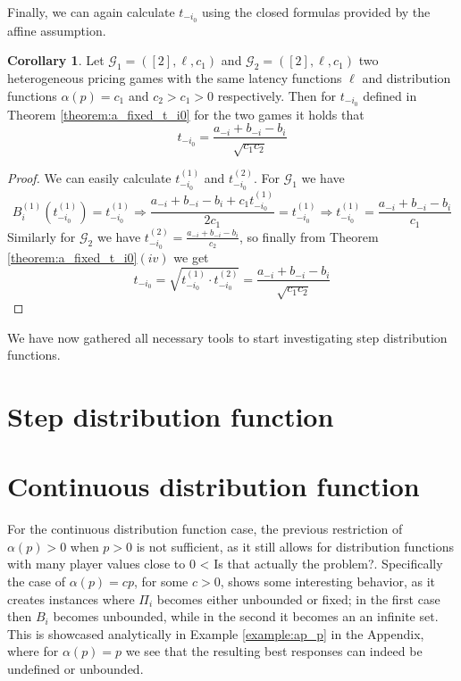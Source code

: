 \documentclass[10pt,a4paper]{book}
\newcommand{\Gm}{\mathcal{G}}
\theoremstyle{definition}
\newtheorem{corollary}[definition]{Corollary}
\theoremstyle{comment}
\begin{document}
Finally, we can again calculate $t_{-i_0}$ using the closed formulas provided by the affine assumption.

\begin{corollary}
	\label{corollary:a_fixed_ti0_calc}
	Let $\Gm_1 = ([2], \ell, c_1)$ and $\Gm_2 = ([2], \ell, c_1)$ two heterogeneous pricing games with the same latency functions $\ell$ and distribution functions $\alpha(p) = c_1$ and $c_2 > c_1 > 0$ respectively.
	Then for $t_{-i_0}$ defined in Theorem \ref{theorem:a_fixed_t_i0} for the two games it holds that
	\[t_{-i_0} = \frac{a_{-i} + b_{-i} - b_i}{\sqrt{c_1 c_2}}\]
\end{corollary}

\begin{proof}
	We can easily calculate $t_{-i_0}^{(1)}$ and $t_{-i_0}^{(2)}$.
	For $\Gm_1$ we have
	\[B_i^{(1)}(t_{-i_0}^{(1)}) = t_{-i_0}^{(1)} \Rightarrow \frac{a_{-i} + b_{-i} - b_i + c_1 t_{-i_0}^{(1)}}{2 c_1} = t_{-i_0}^{(1)} \Rightarrow t_{-i_0}^{(1)} = \frac{a_{-i} + b_{-i} - b_i}{c_1}\]
	Similarly for $\Gm_2$ we have $t_{-i_0}^{(2)} = \frac{a_{-i} + b_{-i} - b_i}{c_2}$, so finally from Theorem \ref{theorem:a_fixed_t_i0}$(iv)$ we get
	\[t_{-i_0} = \sqrt{t_{-i_0}^{(1)} \cdot t_{-i_0}^{(2)}} = \frac{a_{-i} + b_{-i} - b_i}{\sqrt{c_1 c_2}}\]
\end{proof}
We have now gathered all necessary tools to start investigating step distribution functions.

\section{Step distribution function}

\section{Continuous distribution function}

For the continuous distribution function case, the previous restriction of $\alpha(p) > 0$ when $p > 0$ is not sufficient, as it still allows for distribution functions with many player values close to $0$ < Is that actually the problem?.
Specifically the case of $\alpha(p) = cp$, for some $c > 0$, shows some interesting behavior, as it creates instances where $\Pi_i$ becomes either unbounded or fixed; in the first case then $B_i$ becomes unbounded, while in the second it becomes an an infinite set.
This is showcased analytically in Example \ref{example:ap_p} in the Appendix, where for $\alpha(p) = p$ we see that the resulting best responses can indeed be undefined or unbounded.
\end{document}
